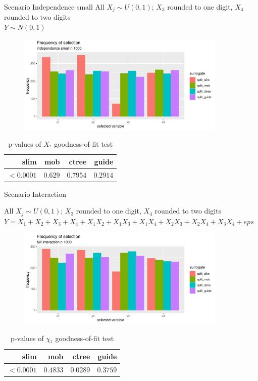 \documentclass[9pt, xcolor=table]{beamer}
\begin{document}
\begin{frame}{Scenario Independence small}
All $X_j \sim U(0,1)$; $X_3$ rounded to one digit, $X_4$ rounded to two digits\\
$Y \sim N(0,1)$
\begin{figure}
    \includegraphics[width=10cm]{Figures/simulations/batchtools/selection_bias_general/independence_small_n1000.pdf}
\end{figure}

\begin{table}
\begin{tabular}[t]{r|r|r|r}
\hline
slim & mob & ctree & guide\\
\hline
$< 0.0001$ & $0.629 $ & $0.7954$ & $0.2914$\\
\hline
\end{tabular}
\caption{p-values of $X_^2$ goodness-of-fit test}
\end{table}

\end{frame}

\begin{frame}{Scenario Interaction}

All $X_j \sim U(0,1)$; $X_3$ rounded to one digit, $X_4$ rounded to two digits\\
$Y = X_1 + X_2 + X_3 + X_4 + X_1 X_2 + X_1 X_3 + X_1 X_4 + X_2 X_3 + X_2 X_4 + X_3 X_4 + eps$
\begin{figure}
    \includegraphics[width=10cm]{Figures/simulations/batchtools/selection_bias_general/full_interaction_n1000.pdf}
\end{figure}

\begin{table}
\centering
\begin{tabular}[t]{r|r|r|r}
\hline
slim & mob & ctree & guide\\
\hline
$ < 0.0001$ & $0.4833 $ & $0.0289$ & $0.3759$\\
\hline
\end{tabular}
\caption{p-values of $\chi_^2$ goodness-of-fit test}
\end{table}
\end{frame}
\end{document}
